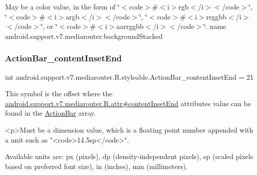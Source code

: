 May be a color value, in the form of \char`\"{}$<$code$>$\#$<$i$>$rgb$<$/i$>$$<$/code$>$\char`\"{}, \char`\"{}$<$code$>$\#$<$i$>$argb$<$/i$>$$<$/code$>$\char`\"{}, \char`\"{}$<$code$>$\#$<$i$>$rrggbb$<$/i$>$$<$/code$>$\char`\"{}, or \char`\"{}$<$code$>$\#$<$i$>$aarrggbb$<$/i$>$$<$/code$>$\char`\"{}.  name android.\+support.\+v7.\+mediarouter\+:background\+Stacked \mbox{\label{classandroid_1_1support_1_1v7_1_1mediarouter_1_1R_1_1styleable_ae206c7fabfc44981bb04d4020240e52a}} 
\subsubsection{\texorpdfstring{Action\+Bar\+\_\+content\+Inset\+End}{ActionBar\_contentInsetEnd}}
{\footnotesize\ttfamily int android.\+support.\+v7.\+mediarouter.\+R.\+styleable.\+Action\+Bar\+\_\+content\+Inset\+End = 21\hspace{0.3cm}{\ttfamily [static]}}

This symbol is the offset where the \hyperlink{classandroid_1_1support_1_1v7_1_1mediarouter_1_1R_1_1attr_a1e18403cb2eb932c1f1398fb56b2b848}{android.\+support.\+v7.\+mediarouter.\+R.\+attr\#content\+Inset\+End} attribute\textquotesingle{}s value can be found in the \hyperlink{classandroid_1_1support_1_1v7_1_1mediarouter_1_1R_1_1styleable_adc4d3c0d096085367f12d025007aa53f}{Action\+Bar} array.

\begin{DoxyVerb}      <p>Must be a dimension value, which is a floating point number appended with a unit such as "<code>14.5sp</code>".
\end{DoxyVerb}
 Available units are\+: px (pixels), dp (density-\/independent pixels), sp (scaled pixels based on preferred font size), in (inches), mm (millimeters). 

